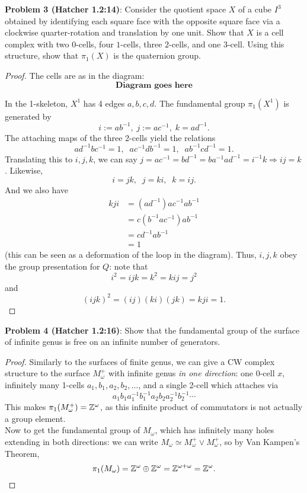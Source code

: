 \documentclass{amsart}
\begin{document}
\newpage
\textbf{Problem 3 (Hatcher 1.2:14)}: Consider the quotient space $X$ of a cube $I^3$ obtained by identifying each square face with the opposite square face via a clockwise quarter-rotation and translation by one unit. Show that $X$ is a cell complex with two $0$-cells, four $1$-cells, three $2$-cells, and one $3$-cell. Using this structure, show that $\pi_1(X)$ is the quaternion group.
\begin{proof}
	The cells are as in the diagram:
	$$
	\textbf{Diagram goes here}
	$$
	
	In the 1-skeleton, $X^1$ has 4 edges $a,b,c,d$. The fundamental group $\pi_1(X^1)$ is generated by 
	$$
	i := ab^{-1}, \; j := ac^{-1}, \; k = ad^{-1}.
	$$
	The attaching maps of the three 2-cells yield the relations
	$$
	ad^{-1}bc^{-1} = 1, \;\; ac^{-1}db^{-1}=1, \;\; ab^{-1}cd^{-1} = 1.
	$$
	Translating this to $i,j,k$, we can say $j = ac^{-1} = bd^{-1} = ba^{-1}ad^{-1} = i^{-1}k \Rightarrow ij = k$. Likewise,
	$$
	i = jk, \;\; j = ki, \;\; k = ij.
	$$
	And we also have 
	\begin{align*}
		kji &= (ad^{-1})ac^{-1}ab^{-1}\\
		&= c(b^{-1}ac^{-1})ab^{-1}\\
		&= cd^{-1}ab^{-1}\\
		&= 1
	\end{align*}
	(this can be seen as a deformation of the loop in the diagram). Thus, $i,j,k$ obey the group presentation for $Q$: note that
	$$
	i^2 = ijk = k^2 = kij = j^2
	$$
	and 
	$$
	(ijk)^2 = (ij)(ki)(jk) = kji = 1.
	$$
\end{proof}

\newpage 
\textbf{Problem 4 (Hatcher 1.2:16)}: Show that the fundamental group of the surface of infinite genus is free on an infinite number of generators.
\begin{proof}
	Similarly to the surfaces of finite genus, we can give a CW complex structure to the surface $M_{\omega}^+$ with infinite genus \textit{in one direction}: one 0-cell $x$, infinitely many 1-cells $a_1,b_1,a_2,b_2,\dots$, and a single 2-cell which attaches via $$a_1b_1a_1^{-1}b_1^{-1}a_2b_2a_2^{-1}b_2^{-1}\cdots$$
	This makes $\pi_1(M_{\omega}^+)=\mathbb{Z}^{\omega}$, as this infinite product of commutators is not actually a group element.\\
	
	Now to get the fundamental group of $M_{\omega}$, which has infinitely many holes extending in both directions: we can write $M_{\omega}\simeq M_{\omega}^+\vee M_{\omega}^+$, so by Van Kampen's Theorem,
	$$\pi_1(M_{\omega})=\mathbb{Z}^{\omega}\oplus \mathbb{Z}^{\omega} = \mathbb{Z}^{\omega+\omega} = \mathbb{Z}^{\omega}.$$
\end{proof}
\end{document}
